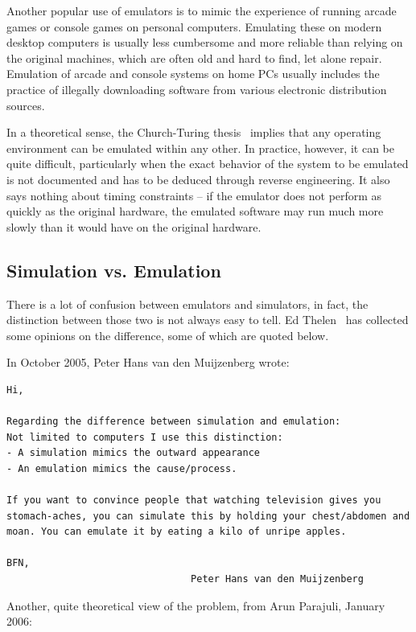 Another  popular use of emulators is to mimic the experience of running arcade
games or console games on personal computers. Emulating these on modern desktop
computers is usually less cumbersome and more reliable than relying on the
original machines, which are often old and hard to find, let alone repair.
Emulation of arcade and console systems on home PCs usually includes the
practice of illegally downloading software from various electronic distribution
sources.

In a theoretical sense, the Church-Turing thesis~\cite{church-turing}
implies that any operating environment can be emulated within any other. In
practice, however, it can be quite difficult, particularly when the exact
behavior of the system to be emulated is not documented and has to be deduced
through reverse engineering. It also says nothing about timing constraints --
if the emulator does not perform as quickly as the original hardware, the
emulated software may run much more slowly than it would have on the original
hardware.


\subsection{Simulation vs. Emulation}

There is a lot of confusion between emulators and simulators, in fact, the
distinction between those two is not always easy to tell. Ed
Thelen~\cite{emu-vs-simu} has collected some opinions on the difference, some of
which are quoted below.

In October 2005, Peter Hans van den Muijzenberg wrote:

\begin{verbatim}
Hi,

Regarding the difference between simulation and emulation:
Not limited to computers I use this distinction:
- A simulation mimics the outward appearance
- An emulation mimics the cause/process.

If you want to convince people that watching television gives you
stomach-aches, you can simulate this by holding your chest/abdomen and
moan. You can emulate it by eating a kilo of unripe apples.

BFN,
                                Peter Hans van den Muijzenberg
\end{verbatim}

Another, quite theoretical view of the problem, from Arun Parajuli, January
2006:

